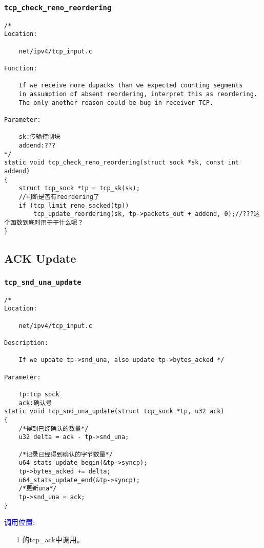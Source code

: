         \subsubsection{\texttt{tcp_check_reno_reordering}}
\begin{verbatim}
/* 
Location:
    
    net/ipv4/tcp_input.c

Function:

    If we receive more dupacks than we expected counting segments
    in assumption of absent reordering, interpret this as reordering.
    The only another reason could be bug in receiver TCP.

Parameter:

    sk:传输控制块
    addend:???
*/
static void tcp_check_reno_reordering(struct sock *sk, const int addend)
{
    struct tcp_sock *tp = tcp_sk(sk);
    //判断是否有reordering了
    if (tcp_limit_reno_sacked(tp))
        tcp_update_reordering(sk, tp->packets_out + addend, 0);//???这个函数到底时用于干什么呢？
}
\end{verbatim}
    \subsection{ACK Update}
        \subsubsection{\texttt{tcp_snd_una_update}}
            \label{ACKUpdate:tcp_snd_una_update}
\begin{verbatim}
/* 
Location:

    net/ipv4/tcp_input.c

Description:

    If we update tp->snd_una, also update tp->bytes_acked */

Parameter:
    
    tp:tcp sock
    ack:确认号
static void tcp_snd_una_update(struct tcp_sock *tp, u32 ack)
{
    /*得到已经确认的数量*/
    u32 delta = ack - tp->snd_una;

    /*记录已经得到确认的字节数量*/
    u64_stats_update_begin(&tp->syncp);
    tp->bytes_acked += delta;
    u64_stats_update_end(&tp->syncp);
    /*更新una*/
    tp->snd_una = ack;
}
\end{verbatim}

        \textcolor{blue}{调用位置}:
            \begin{enumerate}
                \item[1]        \label{ClientReceiveSYN+ACK:tcp_ack}的tcp\_ack中调用。
            \end{enumerate}

